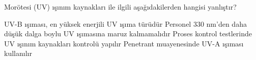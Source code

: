 

\begin{question}[subtitle=]
  Morötesi (UV) ışınım kaynakları ile ilgili aşağıdakilerden hangisi yanlıştır?
	\begin{tasks}
          \task UV-B ışıması, en yüksek enerjili UV ışıma türüdür \correct
          \task Personel 330 nm'den daha düşük dalga boylu UV ışımasına maruz kalmamalıdır 
          \task Proses kontrol testlerinde UV ışınım kaynakları kontrolü yapılır
          \task Penetrant muayenesinde UV-A ışıması kullanılır
	\end{tasks}
\end{question}
\begin{solution}
	\correct
\end{solution}
